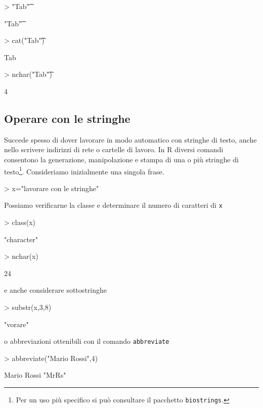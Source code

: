 \documentclass[onecolumn,11pt]{book}
\begin{document}
\begin{Schunk}
\begin{Sinput}
> "Tab\t" 
\end{Sinput}
\begin{Soutput}
[1] "Tab\t"
\end{Soutput}
\begin{Sinput}
> cat("Tab\t")
\end{Sinput}
\begin{Soutput}
Tab	
\end{Soutput}
\begin{Sinput}
> nchar("Tab\t")
\end{Sinput}
\begin{Soutput}
[1] 4
\end{Soutput}
\end{Schunk}

\subsection{Operare con le stringhe}

Succede spesso di dover lavorare in modo automatico con stringhe di testo, anche nello scrivere indirizzi di rete o cartelle di lavoro. In  \textsf{R} diversi comandi consentono la  generazione, manipolazione e stampa di una o pi\`u stringhe di testo\footnote{Per un  uso pi\`u specifico si pu\`o consultare il pacchetto \texttt{biostrings}.}. Consideriamo inizialmente una singola frase.
\begin{Schunk}
\begin{Sinput}
> x="lavorare con le stringhe"
\end{Sinput}
\end{Schunk}
Possiamo verificarne la classe e determinare il numero di caratteri di \texttt{x}
\begin{Schunk}
\begin{Sinput}
> class(x)
\end{Sinput}
\begin{Soutput}
[1] "character"
\end{Soutput}
\begin{Sinput}
> nchar(x)
\end{Sinput}
\begin{Soutput}
[1] 24
\end{Soutput}
\end{Schunk}
e anche considerare sottostringhe
\begin{Schunk}
\begin{Sinput}
> substr(x,3,8)
\end{Sinput}
\begin{Soutput}
[1] "vorare"
\end{Soutput}
\end{Schunk}
o  abbreviazioni ottenibili con il comando \texttt{abbreviate} 
\begin{Schunk}
\begin{Sinput}
> abbreviate("Mario Rossi",4)
\end{Sinput}
\begin{Soutput}
Mario Rossi 
     "MrRs" 
\end{Soutput}
\end{Schunk}
\end{document}
